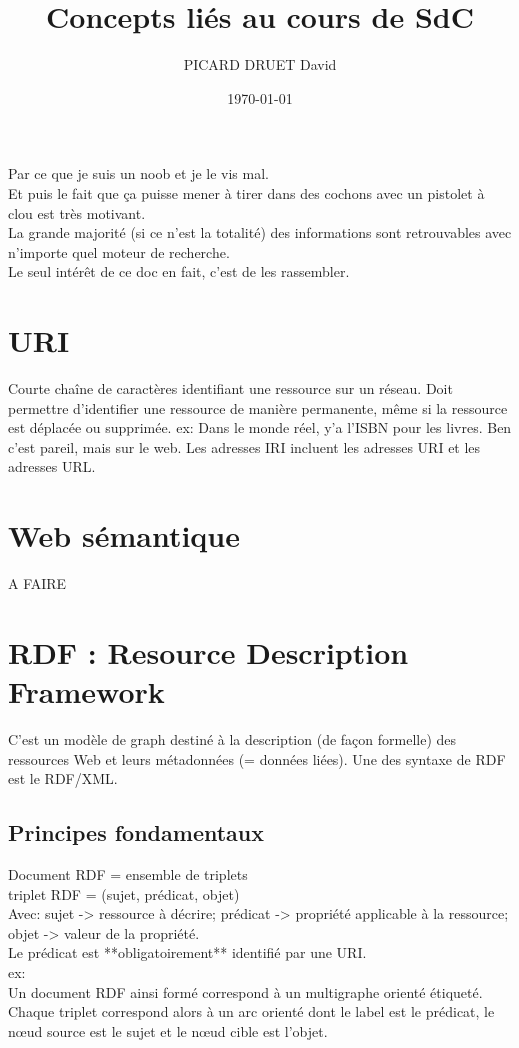 \documentclass[11pt,a4paper]{article}
\title{Concepts liés au cours de SdC}
\author{PICARD DRUET David}
\date{\today}
\begin{document}
\maketitle
Par ce que je suis un noob et je le vis mal.\\
Et puis le fait que ça puisse mener à tirer dans des cochons avec un pistolet à clou est très motivant.\\
La grande majorité (si ce n'est la totalité) des informations sont retrouvables avec n'importe quel moteur de recherche.\\
Le seul intérêt de ce doc en fait, c'est de les rassembler.\\

\section{URI}
Courte chaîne de caractères identifiant une ressource sur un réseau.
Doit permettre d'identifier une ressource de manière permanente, même si la ressource est déplacée ou supprimée.
ex: Dans le monde réel, y'a l'ISBN pour les livres. Ben c'est pareil, mais sur le web.
Les adresses IRI incluent les adresses URI et les adresses URL.

\section{Web sémantique}
A FAIRE

\section{RDF : Resource Description Framework}
C'est un modèle de graph destiné à la description (de façon formelle) des ressources Web et leurs métadonnées (= données liées).
Une des syntaxe de RDF est le RDF/XML.

\subsection{Principes fondamentaux}
Document RDF = ensemble de triplets\\
triplet RDF = (sujet, prédicat, objet)\\
Avec: sujet -> ressource à décrire; prédicat -> propriété applicable à la ressource; objet -> valeur de la propriété.\\
Le prédicat est **obligatoirement** identifié par une URI.\\
ex:\\
Un document RDF ainsi formé correspond à un multigraphe orienté étiqueté. Chaque triplet correspond alors à un arc orienté dont le label est le prédicat, le nœud source est le sujet et le nœud cible est l'objet.
\end{document}
